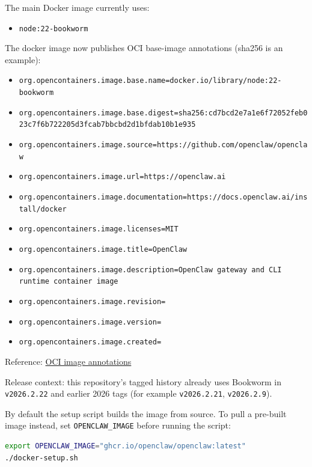 The main Docker image currently uses:

\begin{itemize}
  \item \texttt{node:22-bookworm}
\end{itemize}


The docker image now publishes OCI base-image annotations (sha256 is an example):

\begin{itemize}
  \item \texttt{org.opencontainers.image.base.name=docker.io/library/node:22-bookworm}
  \item \texttt{org.opencontainers.image.base.digest=sha256:cd7bcd2e7a1e6f72052feb023c7f6b722205d3fcab7bbcbd2d1bfdab10b1e935}
  \item \texttt{org.opencontainers.image.source=https://github.com/openclaw/openclaw}
  \item \texttt{org.opencontainers.image.url=https://openclaw.ai}
  \item \texttt{org.opencontainers.image.documentation=https://docs.openclaw.ai/install/docker}
  \item \texttt{org.opencontainers.image.licenses=MIT}
  \item \texttt{org.opencontainers.image.title=OpenClaw}
  \item \texttt{org.opencontainers.image.description=OpenClaw gateway and CLI runtime container image}
  \item \texttt{org.opencontainers.image.revision=}
  \item \texttt{org.opencontainers.image.version=}
  \item \texttt{org.opencontainers.image.created=}
\end{itemize}


Reference: \href{https://github.com/opencontainers/image-spec/blob/main/annotations.md}{OCI image annotations}

Release context: this repository's tagged history already uses Bookworm in
\texttt{v2026.2.22} and earlier 2026 tags (for example \texttt{v2026.2.21}, \texttt{v2026.2.9}).

By default the setup script builds the image from source. To pull a pre-built
image instead, set \texttt{OPENCLAW\_IMAGE} before running the script:

\begin{lstlisting}[language=bash]
export OPENCLAW_IMAGE="ghcr.io/openclaw/openclaw:latest"
./docker-setup.sh
\end{lstlisting}



